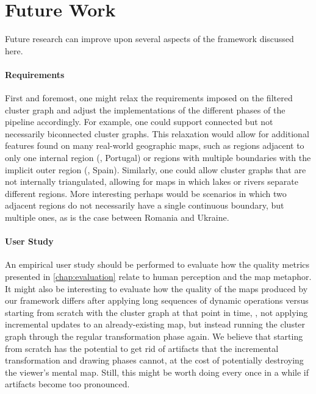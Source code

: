 \section{Future Work}
\label{sect:future-work}

Future research can improve upon several aspects of the framework discussed here.


\paragraph{Requirements}

First and foremost, one might relax the requirements imposed on the filtered cluster graph and adjust the implementations of the different phases of the pipeline accordingly.
For example, one could support connected but not necessarily biconnected cluster graphs.
This relaxation would allow for additional features found on many real-world geographic maps, such as regions adjacent to only one internal region (\eg{}, Portugal) or regions with multiple boundaries with the implicit outer region (\eg{}, Spain).
Similarly, one could allow cluster graphs that are not internally triangulated, allowing for maps in which lakes or rivers separate different regions.
More interesting perhaps would be scenarios in which two adjacent regions do not necessarily have a single continuous boundary, but multiple ones, as is the case between Romania and Ukraine.


\paragraph{User Study}

An empirical user study should be performed to evaluate how the quality metrics presented in \cref{chap:evaluation} relate to human perception and the map metaphor.
It might also be interesting to evaluate how the quality of the maps produced by our framework differs after applying long sequences of dynamic operations versus starting from scratch with the cluster graph at that point in time, \ie{}, not applying incremental updates to an already-existing map, but instead running the cluster graph through the regular transformation phase again.
We believe that starting from scratch has the potential to get rid of artifacts that the incremental transformation and drawing phases cannot, at the cost of potentially destroying the viewer's mental map.
Still, this might be worth doing every once in a while if artifacts become too pronounced.


